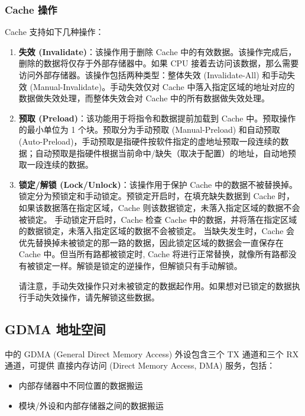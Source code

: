 \documentclass[main\_\_CN.tex]{subfiles}
\begin{document}
\subsubsection{Cache 操作}

\chipname{} Cache 支持如下几种操作：

\begin{enumerate}
\item \textbf{失效 (Invalidate)}：该操作用于删除 Cache 中的有效数据。该操作完成后，删除的数据将仅存于外部存储器中。如果 CPU 接着去访问该数据，那么需要访问外部存储器。该操作包括两种类型：整体失效 (Invalidate-All) 和手动失效 (Manual-Invalidate)。手动失效仅对 Cache 中落入指定区域的地址对应的数据做失效处理，而整体失效会对 Cache 中的所有数据做失效处理。


\item \textbf{预取 (Preload)}：该功能用于将指令和数据提前加载到 Cache 中。预取操作的最小单位为 1 个块。预取分为手动预取 (Manual-Preload) 和自动预取 (Auto-Preload)，手动预取是指硬件按软件指定的虚地址预取一段连续的数据；自动预取是指硬件根据当前命中/缺失（取决于配置）的地址，自动地预取一段连续的数据。


\item \textbf{锁定/解锁 (Lock/Unlock)}：该操作用于保护 Cache 中的数据不被替换掉。锁定分为预锁定和手动锁定。预锁定开启时，在填充缺失数据到 Cache 时，如果该数据落在指定区域，Cache 则该数据锁定，未落入指定区域的数据不会被锁定。 手动锁定开启时，Cache 检查 Cache 中的数据，并将落在指定区域的数据锁定，未落入指定区域的数据不会被锁定。
当缺失发生时，Cache 会优先替换掉未被锁定的那一路的数据，因此锁定区域的数据会一直保存在 Cache 中。但当所有路都被锁定时, Cache 将进行正常替换，就像所有路都没有被锁定一样。解锁是锁定的逆操作，但解锁只有手动解锁。

请注意，手动失效操作只对未被锁定的数据起作用。如果想对已锁定的数据执行手动失效操作，请先解锁这些数据。


\end{enumerate}

\subsection{GDMA 地址空间}

\chipname{} 中的 GDMA (General Direct Memory Access) 外设包含三个 TX 通道和三个 RX 通道，可提供 直接内存访问 (Direct Memory Access, DMA) 服务，包括：

\begin{itemize}
    \item 内部存储器中不同位置的数据搬运
    \item 模块/外设和内部存储器之间的数据搬运
\end{itemize}
\end{document}

